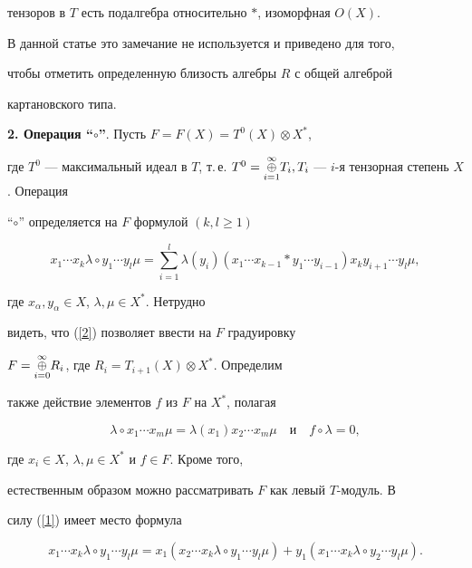 тензоров в $T$ есть подалгебра относительно $*$, изоморфная $O(X)$.


В данной статье это замечание не используется и приведено для того,


чтобы отметить определенную близость алгебры $R$ с общей алгеброй


картановского типа.


\medskip





{\bf 2. Операция ``$\circ $''}. Пусть $F=F(X)=T^0(X)\otimes X^*$,


где $T^0$ --- максимальный идеал в $T$, т.\,е. $T^0=\treato{i=1}{\infty }T_i,


T_i$ --- $i$-я тензорная степень $X$. Операция


``$\circ$'' определяется на $F$ формулой $(k, l \ge 1)$


\begin{equation}\label{2}


x_1\dotsb x_k\lambda \circ y_1\dotsb y_l\mu =


\sum_{i=1}^{l}\lambda (y_i)(x_1\dotsb x_{k-1} * y_1\dotsb


y_{i-1})x_ky_{i+1}\dotsb y_l\mu,


\end{equation}


где $x_{\alpha }, y_{\alpha } \in X$, $\lambda ,\mu \in X^*$. Нетрудно


видеть, что (\ref{2}) позволяет ввести на $F$ градуировку


$F=\underset{i=0}{\overset{\infty}{\oplus}}{}R_i$, где $R_i=T_{i+1}(X)\otimes X^*$. Определим


также действие элементов $f$ из $F$ на $X^*$, полагая


\begin{equation}\label{3}


\lambda \circ x_1\dotsb x_m \mu = \lambda (x_1)x_2\dotsb x_m\mu


\quad\text{и}\quad  f \circ \lambda =0,


\end{equation}


где $x_i \in X$, $\lambda,\mu \in X^*$ и $f \in F$. Кроме того,


естественным образом можно рассматривать $F$ как левый $T$-модуль. В


силу (\ref{1}) имеет место формула


\begin{equation}\label{4}


x_1\dotsb x_k\lambda \circ y_1\dotsb y_l \mu =


x_1(x_2\dotsb x_k\lambda \circ y_1\dotsb y_l \mu )+


y_1(x_1\dotsb x_k\lambda \circ y_2\dotsb y_l \mu).


\end{equation}





